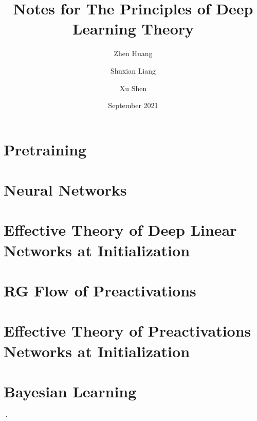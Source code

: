 \documentclass[12pt, letterpaper, twoside]{article}
\title{\textbf{Notes for The Principles of Deep Learning Theory}}
\author{Zhen Huang \and Shuxian Liang \and Xu Shen}
\date{September 2021}
\begin{document}
\begin{titlepage}
\maketitle
\end{titlepage}

\tableofcontents
\newpage

\section{Pretraining}
\label{sec:1}


\section{Neural Networks}
\label{sec:2}


\section{Effective Theory of Deep Linear Networks at Initialization}
\label{sec:3}


\section{RG Flow of Preactivations}
\label{sec:4}


\section{Effective Theory of Preactivations Networks at Initialization}
\label{sec:5}


\section{Bayesian Learning}
\label{sec:6}
·
\end{document}
